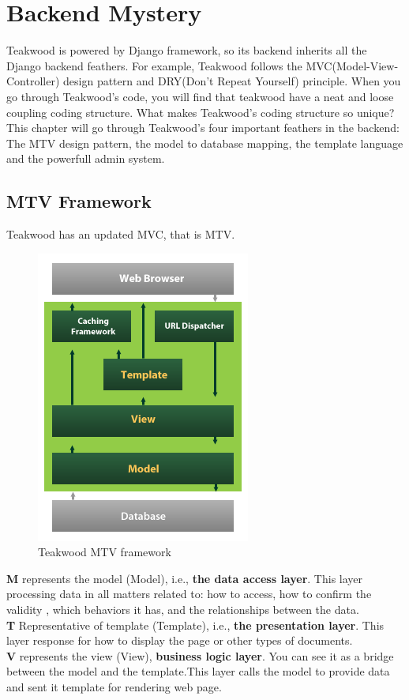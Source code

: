 \chapter{Backend Mystery} 
Teakwood is powered by Django framework, so its backend inherits all the Django  backend feathers. For example, Teakwood follows the MVC(Model-View-Controller) design pattern and DRY(Don't Repeat Yourself) principle. When you go through Teakwood's code, you will find that teakwood have a neat and loose coupling coding structure. What makes Teakwood's coding structure so unique? This chapter will go through Teakwood's four important feathers in the backend: The MTV design pattern, the model to database mapping, the template language and the powerfull admin system.

\section{MTV Framework}
Teakwood has an updated MVC, that is MTV.\\
\begin{figure}[htb]
\centering
\includegraphics[scale=0.7]{./mtv}
\caption{Teakwood MTV framework}
\label{fig:label} %
\end{figure}

\textbf{M} represents the model (Model), i.e., \textbf{the data access layer}. This layer processing data in all matters related to: how to access, how to confirm the validity , which behaviors it has, and the relationships between the data.\\
\textbf{T} Representative of template (Template), i.e., \textbf{the presentation layer}. This layer response for how to display the page or other types of documents.\\
\textbf{V} represents the view (View), \textbf{business logic layer}. You can see it as a bridge between the model and the template.This layer calls the model to provide data and sent it template for rendering web page. \\
\vspace{1in}

